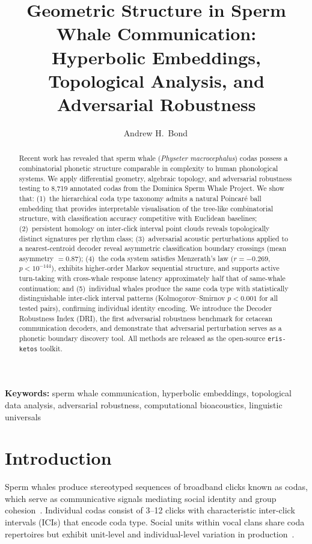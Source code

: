 \documentclass[11pt,a4paper]{article}
\title{Geometric Structure in Sperm Whale Communication:\\
Hyperbolic Embeddings, Topological Analysis, and Adversarial Robustness}
\author[1]{Andrew H.\ Bond\,\orcidlink{0009-0003-2599-6158}}
\affil[1]{Department of Computer Engineering, San Jos\'e State University, San Jos\'e, CA, USA}
\date{}
\begin{document}
\maketitle

\begin{abstract}
Recent work has revealed that sperm whale (\textit{Physeter macrocephalus})
codas possess a combinatorial phonetic structure comparable in complexity
to human phonological systems. We apply differential geometry, algebraic
topology, and adversarial robustness testing to 8{,}719 annotated codas
from the Dominica Sperm Whale Project. We show that: (1)~the hierarchical coda type taxonomy admits a natural Poincar\'e ball
embedding that provides interpretable visualisation of the tree-like
combinatorial structure, with classification accuracy competitive with
Euclidean baselines;
(2)~persistent homology on inter-click interval point clouds reveals
topologically distinct signatures per rhythm class;
(3)~adversarial acoustic perturbations applied to a nearest-centroid
decoder reveal asymmetric classification boundary crossings
(mean asymmetry $= 0.87$); (4)~the coda system satisfies
Menzerath's law ($r = -0.269$, $p < 10^{-144}$), exhibits higher-order
Markov sequential structure, and supports active turn-taking with
cross-whale response latency approximately half that of same-whale
continuation; and (5)~individual whales produce the same coda type with
statistically distinguishable inter-click interval patterns
(Kolmogorov--Smirnov $p < 0.001$ for all tested pairs), confirming
individual identity encoding. We introduce the Decoder Robustness Index
(DRI), the first adversarial robustness benchmark for cetacean
communication decoders, and demonstrate that adversarial perturbation
serves as a phonetic boundary discovery tool. All methods are released
as the open-source \texttt{eris-ketos} toolkit.
\end{abstract}

\noindent\textbf{Keywords:} sperm whale communication, hyperbolic
embeddings, topological data analysis, adversarial robustness,
computational bioacoustics, linguistic universals

\section{Introduction}

Sperm whales produce stereotyped sequences of broadband clicks known as
codas, which serve as communicative signals mediating social identity and
group cohesion~\citep{Weilgart1993,Rendell2003}. Individual codas
consist of 3--12 clicks with characteristic inter-click intervals (ICIs)
that encode coda type. Social units within vocal clans share coda
repertoires but exhibit unit-level and individual-level variation in
production~\citep{Gero2016,Hersh2022}.
\end{document}
